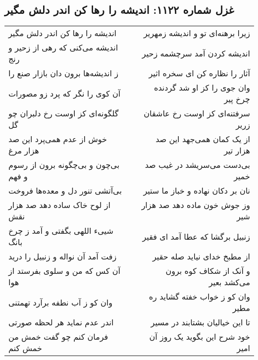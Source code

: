 \begin{center}
\section*{غزل شماره ۱۱۲۲: اندیشه را رها کن اندر دلش مگیر}
\label{sec:1122}
\begin{longtable}{l p{0.5cm} r}
اندیشه را رها کن اندر دلش مگیر
&&
زیرا برهنه‌ای تو و اندیشه زمهریر
\\
اندیشه می‌کنی که رهی از زحیر و رنج
&&
اندیشه کردن آمد سرچشمه زحیر
\\
ز اندیشه‌ها برون دان بازار صنع را
&&
آثار را نظاره کن ای سخره اثیر
\\
آن کوی را نگر که پرد زو مصورات
&&
وان جوی را کز او شد گردنده چرخ پیر
\\
گلگونه‌ای کز اوست رخ دلبران چو گل
&&
سرفتنه‌ای کز اوست رخ عاشقان زریر
\\
خوش از عدم همی‌پرد این صد هزار مرغ
&&
از یک کمان همی‌جهد این صد هزار تیر
\\
بی‌چون و بی‌چگونه برون از رسوم و فهم
&&
بی‌دست می‌سریشد در غیب صد خمیر
\\
بی‌آتشی تنور دل و معده‌ها فروخت
&&
نان بر دکان نهاده و خباز ما ستیر
\\
از لوح خاک ساده دهد صد هزار نقش
&&
وز جوش خون ماده دهد صد هزار شیر
\\
شییء اللهی بگفتی و آمد ز چرخ بانگ
&&
زنبیل برگشا که عطا آمد ای فقیر
\\
زفت آمد آن نواله و زنبیل را درید
&&
از مطبخ خدای نیاید صله حقیر
\\
آن کس که من و سلوی بفرستد از هوا
&&
و آنک از شکاف کوه برون می‌کشد بعیر
\\
وان کو ز آب نطفه برآرد تهمتنی
&&
وان کو ز خواب خفته گشاید ره مطیر
\\
اندر عدم نماید هر لحظه صورتی
&&
تا این خیالیان بشتابند در مسیر
\\
فرمان کنم چو گفت خمش من خمش کنم
&&
خود شرح این بگوید یک روز آن امیر
\\
\end{longtable}
\end{center}
